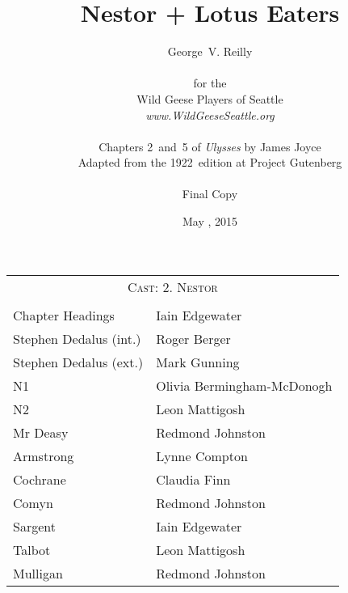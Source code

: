 



\title{\Huge Nestor + Lotus Eaters}
\author{George~V. Reilly\\
\\
{\small for the}\\
Wild Geese Players of Seattle\\
{\emph{www.WildGeeseSeattle.org}}\\
\\
{\small Chapters 2~and~5 of \emph{Ulysses} by James Joyce}\\
{\small Adapted from the 1922~edition at Project Gutenberg}
\\
\\
{\small Final Copy}}
\date{May , 2015}
\raggedbottom



\maketitle
\thispagestyle{empty}
\pagebreak

\begin{tabular}{lp{10cm}}
    \multicolumn{2}{c}{\Large \textsc{Cast: 2. Nestor}} \\
\\
Chapter Headings & Iain Edgewater \\
Stephen Dedalus (int.) & Roger Berger \\
Stephen Dedalus (ext.) & Mark Gunning \\
N1 & Olivia Bermingham-McDonogh \\
N2 & Leon Mattigosh \\
Mr Deasy & Redmond Johnston \\
Armstrong & Lynne Compton \\
Cochrane & Claudia Finn \\
Comyn & Redmond Johnston \\
Sargent & Iain Edgewater \\
Talbot & Leon Mattigosh \\
Mulligan & Redmond Johnston \\
\end{tabular}

\bigskip
\bigskip
\bigskip

